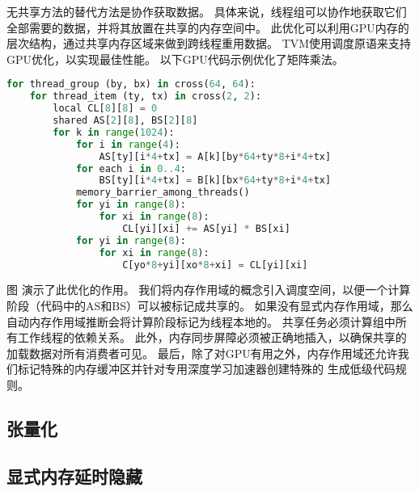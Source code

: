 无共享方法的替代方法是协作获取数据。
具体来说，线程组可以协作地获取它们全部需要的数据，并将其放置在共享的内存空间中。
此优化可以利用GPU内存的层次结构，通过共享内存区域来做到跨线程重用数据。
TVM使用调度原语来支持GPU优化，以实现最佳性能。
以下GPU代码示例优化了矩阵乘法。

\begin{lstlisting}[language={Python}]
for thread_group (by, bx) in cross(64, 64):
    for thread_item (ty, tx) in cross(2, 2):
        local CL[8][8] = 0
        shared AS[2][8], BS[2][8]
        for k in range(1024):
            for i in range(4):
                AS[ty][i*4+tx] = A[k][by*64+ty*8+i*4+tx]
            for each i in 0..4:
                BS[ty][i*4+tx] = B[k][bx*64+ty*8+i*4+tx]
            memory_barrier_among_threads()
            for yi in range(8):
                for xi in range(8):
                    CL[yi][xi] += AS[yi] * BS[xi]
            for yi in range(8):
                for xi in range(8):
                    C[yo*8+yi][xo*8+xi] = CL[yi][xi] 
\end{lstlisting}

图 演示了此优化的作用。
我们将内存作用域的概念引入调度空间，以便一个计算阶段（代码中的AS和BS）可以被标记成共享的。
如果没有显式内存作用域，那么自动内存作用域推断会将计算阶段标记为线程本地的。
共享任务必须计算组中所有工作线程的依赖关系。
此外，内存同步屏障必须被正确地插入，以确保共享的加载数据对所有消费者可见。
最后，除了对GPU有用之外，内存作用域还允许我们标记特殊的内存缓冲区并针对专用深度学习加速器创建特殊的
生成低级代码规则。

\subsection{张量化}

\subsection{显式内存延时隐藏}